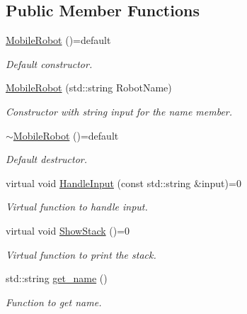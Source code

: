 \subsection*{Public Member Functions}
\begin{DoxyCompactItemize}
\item 
\mbox{\label{class_mobile_robot_a90040b7761ebf4405613f951b14d1a46}} 
\mbox{\hyperlink{class_mobile_robot_a90040b7761ebf4405613f951b14d1a46}{Mobile\+Robot}} ()=default
\begin{DoxyCompactList}\small\item\em Default constructor. \end{DoxyCompactList}\item 
\mbox{\hyperlink{class_mobile_robot_ac093af8693f0a7497daa4679a083a526}{Mobile\+Robot}} (std\+::string Robot\+Name)
\begin{DoxyCompactList}\small\item\em Constructor with string input for the name member. \end{DoxyCompactList}\item 
\mbox{\label{class_mobile_robot_a5729510f8446736a4acdaf4de843ea5c}} 
\mbox{\hyperlink{class_mobile_robot_a5729510f8446736a4acdaf4de843ea5c}{$\sim$\+Mobile\+Robot}} ()=default
\begin{DoxyCompactList}\small\item\em Default destructor. \end{DoxyCompactList}\item 
virtual void \mbox{\hyperlink{class_mobile_robot_a703aa7c008b6e9b5beb5017e7a6d020e}{Handle\+Input}} (const std\+::string \&input)=0
\begin{DoxyCompactList}\small\item\em Virtual function to handle input. \end{DoxyCompactList}\item 
\mbox{\label{class_mobile_robot_acc223c29386839a92fea5001943a0f9b}} 
virtual void \mbox{\hyperlink{class_mobile_robot_acc223c29386839a92fea5001943a0f9b}{Show\+Stack}} ()=0
\begin{DoxyCompactList}\small\item\em Virtual function to print the stack. \end{DoxyCompactList}\item 
std\+::string \mbox{\hyperlink{class_mobile_robot_abb0ed1639db7efeb1b047a07826dfdc0}{get\+\_\+name}} ()
\begin{DoxyCompactList}\small\item\em Function to get name. \end{DoxyCompactList}\end{DoxyCompactItemize}


